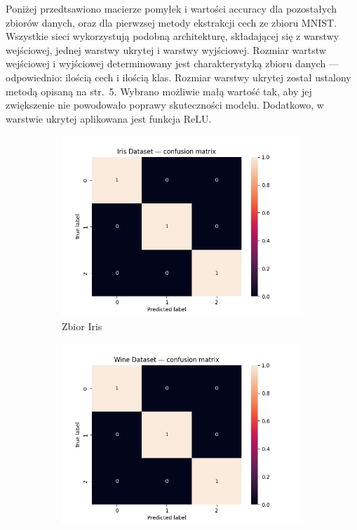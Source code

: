 \documentclass[10pt]{article}
\begin{document}
Poniżej przedtsawiono macierze pomyłek i wartości accuracy dla pozostałych zbiorów danych, oraz dla pierwzsej metody ekstrakcji cech ze zbioru MNIST.
Wszystkie sieci wykorzystują podobną architekturę, składającej się z warstwy wejściowej, jednej warstwy ukrytej i warstwy wyjściowej.
Rozmiar wartstw wejściowej i wyjściowej determinowany jest charakterystyką zbioru danych --- odpowiednio: ilością cech i ilością klas.
Rozmiar warstwy ukrytej został ustalony metodą opisaną na str.~5.
Wybrano możliwie małą wartość tak, aby jej zwiększenie nie powodowało poprawy skuteczności modelu.
Dodatkowo, w warstwie ukrytej aplikowana jest funkcja ReLU\@.

\begin{figure}[H]
    \centering
    \begin{subfigure}[t]{0.3\textwidth}
        \includegraphics[width=\linewidth]{img/iris_cm.png}
        \caption{Zbior Iris}
    \end{subfigure}
    \hfill
    \begin{subfigure}[t]{0.3\textwidth}
        \includegraphics[width=\linewidth]{img/wine_cm.png}

\end{subfigure}
\end{figure}
\end{document}
